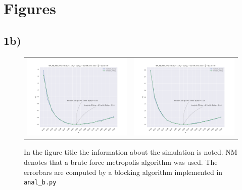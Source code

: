 \section{Figures}
\subsection{1b)}\label{app:fig}
\begin{figure}
\hspace{-2.8cm}
\caption*{In the figure title the information about the simulation is noted. NM denotes that a brute force metropolis  algorithm was used. The errorbars are computed by a blocking algorithm implemented in \lstinline{anal_b.py}}
\begin{tabular}{cc}
\includegraphics[width = 0.5\paperwidth]{figures/NM_NIA_NIN_np_1_nd_1.pdf} & \includegraphics[width = 0.5\paperwidth]{figures/NM_NIA_NIN_np_1_nd_2.pdf} \\

\end{tabular}
\end{figure}
